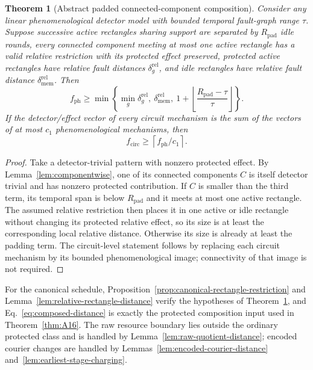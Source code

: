 \documentclass[aps,prx,reprint,superscriptaddress,nofootinbib,floatfix,longbibliography]{revtex4-2}
\newtheorem{theorem}{Theorem}[section]
\theoremstyle{definition}
\begin{document}
\begin{theorem}[Abstract padded connected-component composition]
\label{thm:abstract-padded-composition}
Consider any linear phenomenological detector model with bounded temporal
fault-graph range $\tau$.  Suppose successive active rectangles sharing
support are separated by $R_{\mathrm{pad}}$ idle rounds, every connected component
meeting at most one active rectangle has a valid relative restriction with
its protected effect preserved, protected active rectangles have relative
fault distances $\delta_g^{\mathrm{rel}}$, and idle rectangles have relative fault
distance $\delta_{\mathrm{mem}}^{\mathrm{rel}}$.  Then
\begin{equation}
 f_{\mathrm{ph}}\geq
 \min\left\{
   \min_g\delta_g^{\mathrm{rel}},\ \delta_{\mathrm{mem}}^{\mathrm{rel}},\
   1+\left\lfloor\frac{R_{\mathrm{pad}}-\tau}{\tau}\right\rfloor
 \right\}.                                                        \label{eq:composed-distance}
\end{equation}
If the detector/effect vector of every circuit mechanism is the sum of the
vectors of at most $c_1$ phenomenological mechanisms, then
\begin{equation}
 f_{\mathrm{circ}}\geq\left\lceil f_{\mathrm{ph}}/c_1\right\rceil.           \label{eq:circuit-distance}
\end{equation}
\end{theorem}
\begin{proof}
Take a detector-trivial pattern with nonzero protected effect.  By
Lemma~\ref{lem:componentwise}, one of its connected components $C$ is
itself detector trivial and has nonzero protected contribution.  If $C$ is
smaller than the third term, its temporal span is below $R_{\mathrm{pad}}$ and it
meets at most one active rectangle.  The assumed relative restriction then
places it in one active or idle rectangle without changing its protected
relative effect, so its size is at least the corresponding local relative
distance.  Otherwise its size is already at least the padding term.  The
circuit-level statement follows by replacing each circuit mechanism by its
bounded phenomenological image; connectivity of that image is not required.
\end{proof}

For the canonical schedule, Proposition~\ref{prop:canonical-rectangle-restriction} and Lemma~\ref{lem:relative-rectangle-distance} verify the hypotheses of
Theorem~\ref{thm:abstract-padded-composition}, and Eq.~\eqref{eq:composed-distance}
is exactly the protected composition input used in Theorem~\ref{thm:A16}.
The raw resource boundary lies outside the ordinary protected class and is handled by Lemma~\ref{lem:raw-quotient-distance}; encoded courier
changes are handled by Lemmas~\ref{lem:encoded-courier-distance} and~\ref{lem:earliest-stage-charging}.
\end{document}
